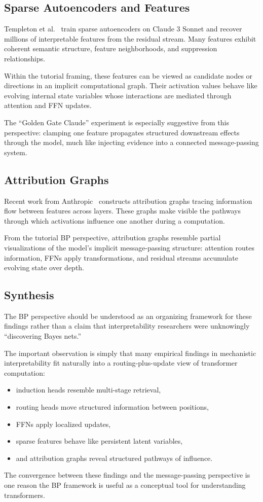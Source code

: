 \subsection*{Sparse Autoencoders and Features}

Templeton et al.~\cite{templeton2024monosemanticity} train sparse
autoencoders on Claude 3 Sonnet and recover millions of interpretable
features from the residual stream. Many features exhibit coherent
semantic structure, feature neighborhoods, and suppression
relationships.

Within the tutorial framing, these features can be viewed as candidate
nodes or directions in an implicit computational graph. Their activation
values behave like evolving internal state variables whose interactions
are mediated through attention and FFN updates.

The ``Golden Gate Claude'' experiment is especially suggestive from this
perspective: clamping one feature propagates structured downstream
effects through the model, much like injecting evidence into a connected
message-passing system.

\subsection*{Attribution Graphs}

Recent work from Anthropic~\cite{anthropic2025attribution} constructs
attribution graphs tracing information flow between features across
layers. These graphs make visible the pathways through which activations
influence one another during a computation.

From the tutorial BP perspective, attribution graphs resemble partial
visualizations of the model's implicit message-passing structure:
attention routes information, FFNs apply transformations, and residual
streams accumulate evolving state over depth.

\subsection*{Synthesis}

The BP perspective should be understood as an organizing framework for
these findings rather than a claim that interpretability researchers
were unknowingly ``discovering Bayes nets.''

The important observation is simply that many empirical findings in
mechanistic interpretability fit naturally into a routing-plus-update
view of transformer computation:
\begin{itemize}
\item induction heads resemble multi-stage retrieval,
\item routing heads move structured information between positions,
\item FFNs apply localized updates,
\item sparse features behave like persistent latent variables,
\item and attribution graphs reveal structured pathways of influence.
\end{itemize}

The convergence between these findings and the message-passing
perspective is one reason the BP framework is useful as a conceptual
tool for understanding transformers.
